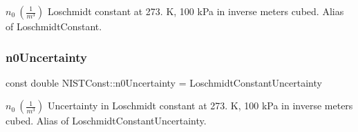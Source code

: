 $n_0 \ (\frac{1}{m^3})$ Loschmidt constant at 273. K, 100 k\+Pa in inverse meters cubed. Alias of Loschmidt\+Constant. \mbox{\label{group___loschmidt_constant_gab05aaddbc9cb5a104a42cc83ab752d78}} 
\subsubsection{\texorpdfstring{n0\+Uncertainty}{n0Uncertainty}}
{\footnotesize\ttfamily const double N\+I\+S\+T\+Const\+::n0\+Uncertainty = Loschmidt\+Constant\+Uncertainty}

$n_0 \ (\frac{1}{m^3})$ Uncertainty in Loschmidt constant at 273. K, 100 k\+Pa in inverse meters cubed. Alias of Loschmidt\+Constant\+Uncertainty. 